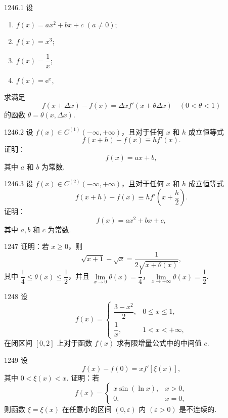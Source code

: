 \begin{prob}[L]{1246.1}
设
\begin{enumerate}[label=(\alph*), itemsep=2pt, topsep=3pt]
  \item $f(x) = ax^2 + bx + c$ $(a \neq 0)$;
  \item $f(x) = x^3$;
  \item $f(x) = \dfrac{1}{x}$;
  \item $f(x) = \mathrm{e}^x$,
\end{enumerate}
求满足
\[
f(x + \Delta x) - f(x) = \Delta x f'(x + \theta \Delta x) \quad (0 < \theta < 1)
\]
的函数 $\theta = \theta(x, \Delta x)$.
\end{prob}

\begin{prob}[M]{1246.2}
设 $f(x) \in C^{(1)}(-\infty, +\infty)$，且对于任何 $x$ 和 $h$ 成立恒等式
\[
f(x + h) - f(x) \equiv h f'(x).
\]
证明：
\[
f(x) = ax + b,
\]
其中 $a$ 和 $b$ 为常数.
\end{prob}

\begin{prob}[M]{1246.3}
设 $f(x) \in C^{(2)}(-\infty, +\infty)$，且对于任何 $x$ 和 $h$ 成立恒等式
\[
f(x + h) - f(x) \equiv h f'\left(x + \frac{h}{2}\right).
\]
证明：
\[
f(x) = ax^2 + bx + c,
\]
其中 $a, b$ 和 $c$ 为常数.
\end{prob}

\begin{prob}[M]{1247}
证明：若 $x \geqslant 0$，则
\[
\sqrt{x + 1} - \sqrt{x} = \frac{1}{2\sqrt{x + \theta(x)}},
\]
其中 $\dfrac{1}{4} \leqslant \theta(x) \leqslant \dfrac{1}{2}$，并且 $\lim\limits_{x \to 0} \theta(x) = \dfrac{1}{4}$，$\lim\limits_{x \to +\infty} \theta(x) = \dfrac{1}{2}$.
\end{prob}

\begin{prob}[M]{1248}
设
\[
f(x) = \begin{cases}
\dfrac{3 - x^2}{2}, & 0 \leqslant x \leqslant 1, \\[4pt]
\dfrac{1}{x}, & 1 < x < +\infty,
\end{cases}
\]
在闭区间 $[0, 2]$ 上对于函数 $f(x)$ 求有限增量公式中的中间值 $c$.
\end{prob}

\begin{prob}[M]{1249}
设
\[
f(x) - f(0) = x f'[\xi(x)],
\]
其中 $0 < \xi(x) < x$. 证明：若
\[
f(x) = \begin{cases}
x \sin(\ln x), & x > 0, \\
0, & x = 0,
\end{cases}
\]
则函数 $\xi = \xi(x)$ 在任意小的区间 $(0, \varepsilon)$ 内 $(\varepsilon > 0)$ 是不连续的.
\end{prob}

